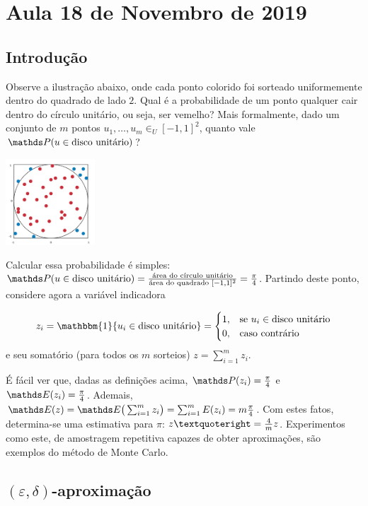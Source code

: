 \section{Aula 18 de Novembro de 2019}
\label{2019_11_18}

\subsection{Introdução}

Observe a ilustração abaixo, onde cada ponto colorido foi sorteado uniformemente dentro do quadrado de lado $2$. Qual é a probabilidade de um ponto qualquer cair dentro do círculo unitário, ou seja, ser vemelho? Mais formalmente, dado um conjunto de $m$ pontos $u_1, \dots, u_m \in_U [-1,1]^2$, quanto vale $\PP(u \in \text{disco unitário})$?

\includegraphics[width=0.25\textwidth]{aulas/11_18/PiBoard.png}

Calcular essa probabilidade é simples: $\PP(u \in \text{disco unitário}) = {\text{área do círculo unitário} \over \text{área do quadrado } [-1,1]^2} = {\pi \over 4}$. Partindo deste ponto, considere agora a variável indicadora

$$
z_i = \mathbbm{1}\{u_i \in \text{disco unitário}\} = 
\begin{cases}
    1, & \text{se } u_i \in \text{disco unitário} \\
    0, & \text{caso contrário}
\end{cases}
$$ e seu somatório (para todos os $m$ sorteios) $z = \sum_{i = 1}^m z_i$.

É fácil ver que, dadas as definições acima, $\PP(z_i) = {\pi \over 4}$ e $\EE(z_i) = {\pi \over 4}$. Ademais, $\EE(z) = \EE\big(\sum_{i = 1}^m z_i\big) = \sum_{i = 1}^m E(z_i) = m {\pi \over 4}$. Com estes fatos, determina-se uma estimativa para $\pi$: $z’ = {4 \over m} z$. Experimentos como este, de amostragem repetitiva capazes de obter aproximações, são exemplos do método de Monte Carlo.

\subsection{$(\varepsilon, \delta)$-aproximação}

